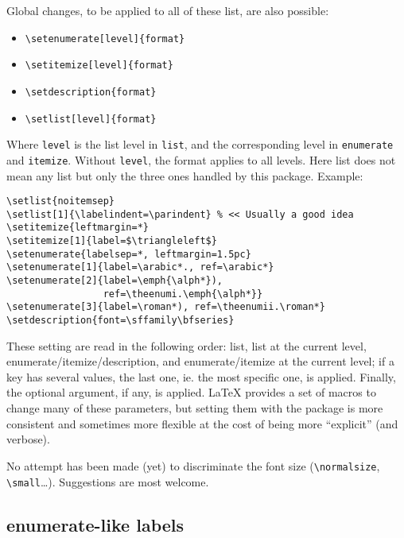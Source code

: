 \documentclass{article}
\begin{document}
Global changes, to be applied to all of these list, are also
possible:
\begin{itemize}
\item \verb|\setenumerate[level]{format}|
\item \verb|\setitemize[level]{format}| 
\item \verb|\setdescription{format}|
\item \verb|\setlist[level]{format}|
\end{itemize}
Where \verb|level| is the list level in \verb|list|, and the
corresponding level in \verb|enumerate| and \verb|itemize|.  Without
\verb|level|, the format applies to all levels.  Here list does not
mean any list but only the three ones handled by this package.
Example:
\begin{verbatim}
\setlist{noitemsep}
\setlist[1]{\labelindent=\parindent} % << Usually a good idea
\setitemize{leftmargin=*}
\setitemize[1]{label=$\triangleleft$}
\setenumerate{labelsep=*, leftmargin=1.5pc}
\setenumerate[1]{label=\arabic*., ref=\arabic*}
\setenumerate[2]{label=\emph{\alph*}),
                 ref=\theenumi.\emph{\alph*}}
\setenumerate[3]{label=\roman*), ref=\theenumii.\roman*}
\setdescription{font=\sffamily\bfseries}
\end{verbatim}
These setting are read in the following order: list,
list at the current level, enumerate/itemize/description,
and enumerate/itemize at the current level; if a key
has several values, the last one, ie. the most specific
one, is applied. Finally, the
optional argument, if any, is applied. \LaTeX{} provides
a set of macros to change many of these parameters, but
setting them with the package is more consistent and
sometimes more flexible at the cost of being more
``explicit'' (and verbose).

No attempt has been made (yet) to discriminate the font size
(\verb|\normalsize|, \verb|\small|\dots). Suggestions are
most welcome.

\subsection{\textsf{enumerate}-like labels}
\end{document}
